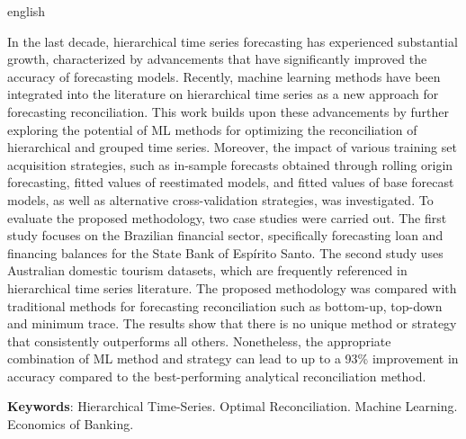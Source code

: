 \begin{resumo}[Abstract]
  \begin{otherlanguage*}{english}
    
    In the last decade, hierarchical time series forecasting has experienced substantial growth, characterized by advancements that have significantly improved the accuracy of forecasting models. Recently, machine learning methods have been integrated into the literature on hierarchical time series as a new approach for forecasting reconciliation. This work builds upon these advancements by further exploring the potential of ML methods for optimizing the reconciliation of hierarchical and grouped time series. Moreover, the impact of various training set acquisition strategies, such as in-sample forecasts obtained through rolling origin forecasting, fitted values of reestimated models, and fitted values of base forecast models, as well as alternative cross-validation strategies, was investigated. To evaluate the proposed methodology, two case studies were carried out. The first study focuses on the Brazilian financial sector, specifically forecasting loan and financing balances for the State Bank of Espírito Santo. The second study uses Australian domestic tourism datasets, which are frequently referenced in hierarchical time series literature. The proposed methodology was compared with traditional methods for forecasting reconciliation such as bottom-up, top-down and minimum trace. The results show that there is no unique method or strategy that consistently outperforms all others. Nonetheless, the appropriate combination of ML method and strategy can lead to up to a 93\% improvement in accuracy compared to the best-performing analytical reconciliation method.
    \vspace{\onelineskip}
 
    \noindent 
    \textbf{Keywords}: Hierarchical Time-Series. Optimal Reconciliation. Machine Learning. Economics of Banking.
  \end{otherlanguage*}
\end{resumo}

\listoffigures*
\cleardoublepage


\listoftables*
\cleardoublepage

